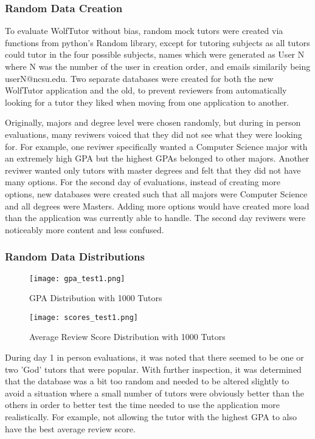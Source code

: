 \subsubsection{Random Data Creation}
To evaluate WolfTutor without bias, random mock tutors were 
created via functions from python's Random library, except for
tutoring subjects as all tutors could tutor in the four possible subjects,
names which were generated as User N where N was the number of the 
user in creation order, and emails similarily being userN@ncsu.edu. Two 
separate databases were created for both the new WolfTutor application
and the old, to prevent reviewers from automatically looking for a tutor
they liked when moving from one application to another.

Originally, majors and degree level were chosen randomly, but
during in person evaluations, many reviwers voiced that they did not
see what they were looking for. For example, one reviwer specifically wanted
a Computer Science major with an extremely high GPA but the highest GPAs 
belonged to other majors. Another reviwer wanted only tutors with master degrees
and felt that they did not have many options. For the second day of 
evaluations, instead of creating more options, new databases were created such that all majors
were Computer Science and all degrees were Masters. Adding more options
would have created more load than the application was currently able to handle.
The second day reviwers were noticeably more content and less confused.


\subsubsection{Random Data Distributions}

\begin{figure}[t]
\caption{GPA Distribution with 1000 Tutors}
\texttt{[image: gpa\_test1.png]}
\label{fig:gpa}
\end{figure}

\begin{figure}[t]
\caption{Average Review Score Distribution with 1000 Tutors}
\texttt{[image: scores\_test1.png]}
\label{fig:scores}
\end{figure}

During day 1 in person evaluations, it was noted that there
seemed to be one or two 'God' tutors that were popular. With
further inspection, it was determined that the database was a bit
too random and needed to be altered slightly to avoid a situation where a 
small number of tutors were obviously better than the others in order
to better test the time needed to use the application more realistically.
For example, not allowing the tutor with the highest GPA to also have the
best average review score.

